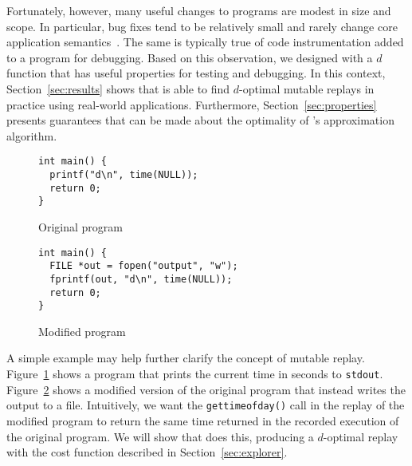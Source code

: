 Fortunately, however, many useful changes to programs are modest in size and scope.
In particular, bug fixes tend to be relatively small and rarely change
core application semantics~\cite{delta,mreplay-feas}.  The same is
typically true of code instrumentation added to a program for
debugging. Based on this observation, we designed {\dora} with a
$d$ function that has useful properties for testing and debugging.  In
this context, Section~\ref{sec:results} shows that {\dora} is able
to find $d$-optimal mutable replays in practice using real-world
applications. Furthermore, Section~\ref{sec:properties} presents
guarantees that can be made about the optimality of {\dora}'s
approximation algorithm.

\begin{figure}
\begin{center}
\begin{footnotesize}
\begin{verbatim}
int main() {
  printf("d\n", time(NULL));
  return 0;
}
\end{verbatim}
\end{footnotesize}
\end{center}
\caption{Original program}
\label{fig:orig-code}
\end{figure}

\begin{figure}
\begin{center}
\begin{footnotesize}
\begin{verbatim}
int main() {
  FILE *out = fopen("output", "w");
  fprintf(out, "d\n", time(NULL));
  return 0;
}
\end{verbatim}
\end{footnotesize}
\end{center}
\caption{Modified program}
\label{fig:mod-code}
\end{figure}

A simple example may help further clarify the concept of
mutable replay.  Figure~\ref{fig:orig-code} shows a program that
prints the current time in seconds to {\tt stdout}. Figure~\ref{fig:mod-code}
shows a modified version of the original program that instead writes the output to a file.
Intuitively, we want the {\tt gettimeofday()} call in the replay of the
modified program to return the same time returned in the recorded
execution of the original program.
We will show that {\dora} does this, producing a $d$-optimal replay
with the cost function described in Section~\ref{sec:explorer}. 

